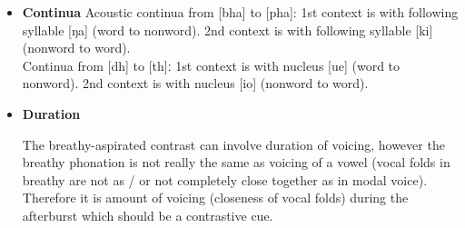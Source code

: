 \documentclass[12pt, english]{article}
\begin{document}
\begin{itemize}
    Participants are going to be tested online using Zoom online meetings, and recruited through author's contacts, and likely by reaching out to Assam/Northeast related online forums like on reddit. The plan is to have non-native English speakers ideally all from Guwahati with same L1, this is to neutralise individual factors like regional variation, exposure to English. A different experiment setup can be by using a qualtrics form along with online meet, so the participants have more autonomy with the test and excess to stimuli on their device while also making it easier to see if they are in a quiet environment. \par
    \item \textbf{Continua}
    Acoustic continua from [bha] to [pha]: 1st context is with following syllable [ŋa] (word to nonword). 2nd context is with following syllable [ki] (nonword to word). \\
    Continua from [dh] to [th]ː 1st context is with nucleus [ue] (word to nonword). 2nd context is with nucleus [io] (nonword to word). \par
    \item \textbf{Duration} \par
    The breathy-aspirated contrast can involve duration of voicing, however the breathy phonation is not really the same as voicing of a vowel (vocal folds in breathy are not as / or not completely close together as in modal voice). Therefore it is amount of voicing (closeness of vocal folds) during the afterburst which should be a contrastive cue.
\end{itemize}

\end{document}
